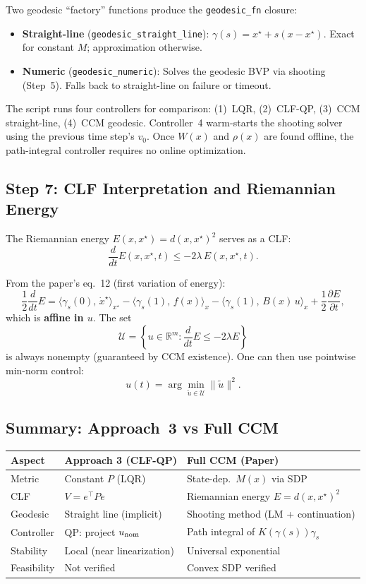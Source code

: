 \documentclass[11pt,a4paper]{article}
\begin{document}
Two geodesic ``factory'' functions produce the \texttt{geodesic\_fn} closure:
\begin{itemize}[leftmargin=2em]
\item \textbf{Straight-line} (\texttt{geodesic\_straight\_line}): \(\gamma(s) = x^\star + s(x - x^\star)\). Exact for constant \(M\); approximation otherwise.
\item \textbf{Numeric} (\texttt{geodesic\_numeric}): Solves the geodesic BVP via shooting (Step~5). Falls back to straight-line on failure or timeout.
\end{itemize}

\noindent The script runs four controllers for comparison: (1)~LQR, (2)~CLF-QP, (3)~CCM straight-line, (4)~CCM geodesic.  Controller~4 warm-starts the shooting solver using the previous time step's \(v_0\).  Once \(W(x)\) and \(\rho(x)\) are found offline, the path-integral controller requires no online optimization.

\subsection{Step 7: CLF Interpretation and Riemannian Energy}

The Riemannian energy \(E(x, x^\star) = d(x, x^\star)^2\) serves as a CLF:
\[
\frac{d}{dt}E(x, x^\star, t) \le -2\lambda\, E(x, x^\star, t).
\]

From the paper's eq.~12 (first variation of energy):
\[
\frac{1}{2}\frac{d}{dt}E = \langle \gamma_s(0),\, \dot x^\star \rangle_{x^\star} - \langle \gamma_s(1),\, f(x)\rangle_{x} - \langle \gamma_s(1),\, B(x)\,u\rangle_{x} + \frac{1}{2}\frac{\partial E}{\partial t},
\]
which is \textbf{affine in \(u\)}. The set
\[
\mathcal{U} = \left\{ u \in \mathbb{R}^m : \frac{d}{dt}E \le -2\lambda E \right\}
\]
is always nonempty (guaranteed by CCM existence). One can then use pointwise min-norm control:
\[
u(t) = \arg\min_{\tilde u \in \mathcal{U}} \|\tilde u\|^2.
\]

\subsection{Summary: Approach~3 vs Full CCM}

\begin{center}
\begin{tabular}{>{\raggedright}p{4.5cm} p{4.5cm} p{4.5cm}}
\toprule
\textbf{Aspect} & \textbf{Approach 3 (CLF-QP)} & \textbf{Full CCM (Paper)} \\
\midrule
Metric & Constant \(P\) (LQR) & State-dep.\ \(M(x)\) via SDP \\
CLF & \(V = e^\top P e\) & Riemannian energy \(E = d(x,x^\star)^2\) \\
Geodesic & Straight line (implicit) & Shooting method (LM + continuation) \\
Controller & QP: project \(u_{\rm nom}\) & Path integral of \(K(\gamma(s))\gamma_s\) \\
Stability & Local (near linearization) & Universal exponential \\
Feasibility & Not verified & Convex SDP verified \\
\bottomrule
\end{tabular}
\end{center}
\end{document}

